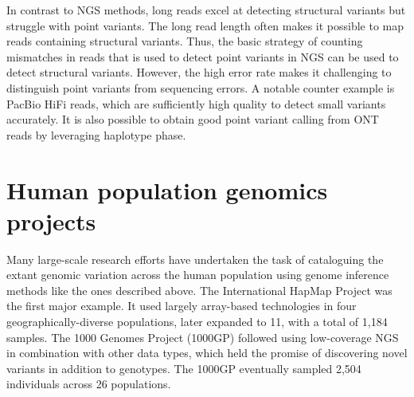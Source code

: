 \documentclass[11pt]{ucthesis}
\begin{document}

In contrast to NGS methods, long reads excel at detecting structural variants but struggle with point variants. The long read length often makes it possible to map reads containing structural variants. Thus, the basic strategy of counting mismatches in reads that is used to detect point variants in NGS can be used to detect structural variants\cite{sedlazeck2018accurate,huddleston2017discovery}. However, the high error rate makes it challenging to distinguish point variants from sequencing errors. A notable counter example is PacBio HiFi reads, which are sufficiently high quality to detect small variants accurately\cite{wenger2019accurate}. It is also possible to obtain good point variant calling from ONT reads by leveraging haplotype phase\cite{shafin2021haplotype}.


\section{Human population genomics projects}

Many large-scale research efforts have undertaken the task of cataloguing the extant genomic variation across the human population using genome inference methods like the ones described above. The International HapMap Project was the first major example. It used largely array-based technologies in four geographically-diverse populations\cite{international2005haplotype,international2007second}, later expanded to 11\cite{international2010integrating}, with a total of 1,184 samples. The 1000 Genomes Project (1000GP) followed using low-coverage NGS in combination with other data types, which held the promise of discovering novel variants in addition to genotypes\cite{10002010map,10002012integrated}. The 1000GP eventually sampled 2,504 individuals across 26 populations\cite{10002015global}.
\end{document}
